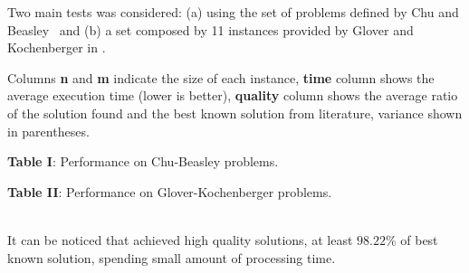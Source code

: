 Two main tests was considered:
(a) using the set of problems defined by Chu and Beasley~\cite{Chu-Beasley-1998}
and (b) a set composed by 11 instances provided by Glover and Kochenberger in
\cite{glover1996critical}.

Columns {\bf n} and {\bf m} indicate the size of each instance,
{\bf time} column shows the average execution time (lower is better),
{\bf quality} column shows the average ratio of the solution found and
the best known solution from literature, variance shown in parentheses.
\\[2pt]
\begin{minipage}[c]{0.4\linewidth}
  \begin{center}
      {\bf Table I}: Performance on Chu-Beasley problems. \\
    
  \end{center}
  \vfill
\end{minipage}
\begin{minipage}[c]{0.6\linewidth}
  \begin{center}
      {\bf Table II}: Performance on Glover-Kochenberger problems.  \\
    
  \end{center}
\end{minipage}
\\

It can be noticed that \scecore achieved high quality solutions, at least $98.22\%$
of best known solution, spending small amount of processing time.
